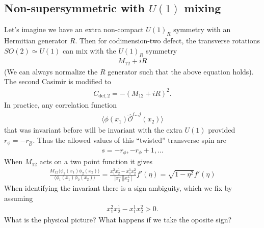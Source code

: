\documentclass[letterpaper]{article}
\let\Oldsubsection\subsection
\renewcommand{\subsection}{\FloatBarrier\Oldsubsection}
\let\Oldsubsubsection\subsubsection
\renewcommand{\subsubsection}{\FloatBarrier\Oldsubsubsection}
\def\Om{{\mathcal{O}}}
\begin{document}
\subsection{Non-supersymmetric with \texorpdfstring{$U(1)$}{U(1)} mixing}

Let's imagine we have an extra non-compact $U(1)_R$ symmetry with an Hermitian generator $R$.
Then for codimension-two defect, the transverse rotations $SO(2) \simeq U(1)$ can mix with the $U(1)_R$ symmetry
\begin{align}
 M_{12} + i R
\end{align}
(We can always normalize the $R$ generator such that the above equation holds).
The second Casimir is modified to
\begin{align}
C_{\text{def},2} = - (M_{12} + i R)^2.
\end{align}
In practice, any correlation function
\begin{align}
 \langle \phi(x_1) \hat \Om^{i\ldots j}(x_2) \rangle
\end{align}
that was invariant before will be invariant with the extra $U(1)$ provided $r_\phi = - r_{\hat \Om}$.
Thus the allowed values of this ``twisted'' transverse spin are
\begin{align}
 s = - r_{\phi}, - r_{\phi} + 1, \ldots
\end{align}
When $M_{12}$ acts on a two point function it gives
\begin{align}
 \frac{M_{12} \langle \phi_1(x_1) \phi_2(x_2) \rangle}
      {\langle \phi_1(x_1) \phi_2(x_2) \rangle}
 = \frac{x_1^2 x_2^1 - x_1^1 x_2^2}{|x_1^\bot||x_2^\bot|} f'(\eta)
 = \sqrt{1-\eta^2} f'(\eta)
\end{align}
When identifying the invariant there is a sign ambiguity, which we fix by assuming
\begin{align}
 x_1^2 x_2^1 - x_1^1 x_2^2 > 0.
\end{align}
What is the physical picture? What happens if we take the oposite sign?

\end{document}
